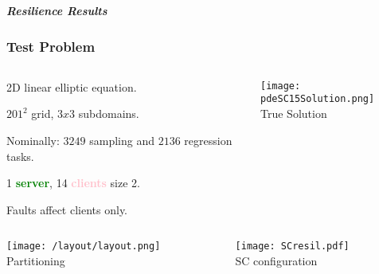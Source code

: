 


\begin{frame}

\vspace{0.5cm}
\centering
\begin{block}{}
\centering
\textbf{\Large{{\it {Resilience Results}}}}
\end{block}
%
\end{frame}



\begin{frame}
\frametitle{Test Problem}
%
\vspace{-0.05cm}

\begin{columns}
\begin{column}{0.65\textwidth}
\bi
\item 2D linear elliptic equation.
\item $201^2$ grid, $3x3$ subdomains.
\item Nominally: $3249$ sampling and $2136$ regression tasks. 
\item 1 {\bf \textcolor{green}{server}}, 
14 {\bf \textcolor{pink}{clients}} size 2. 
\item Faults affect clients only.
\ei
\end{column}
\begin{column}{0.4\textwidth}
\vspace{-0.35cm}
\begin{center}
\texttt{[image: pdeSC15Solution.png]}\\
{\small True Solution}
\end{center}
\end{column}
\end{columns}
%
\vspace{0.2cm}
%
\begin{columns}
\begin{column}{0.55\textwidth}
\begin{center}
\vspace{-0.4cm}
\texttt{[image: /layout/layout.png]}\\
{\small Partitioning}
\end{center}
\end{column}
\begin{column}{0.55\textwidth}
\begin{center}
\vspace{-0.5cm}
\texttt{[image: SCresil.pdf]}\\
{\small SC configuration}
\end{center}
\end{column}
\end{columns}
%
\end{frame}




